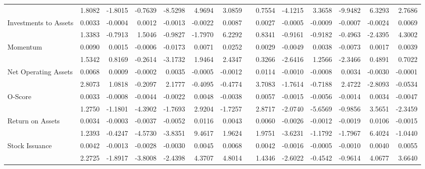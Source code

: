 \begin{table}[h]
{\begin{tabular}{lrrrrrrrrrrrrr}
& 1.8082 & -1.8015 & -0.7639 & -8.5298 & 4.9694 & 3.0859 &       & 0.7554 & -4.1215 & 3.3658 & -9.9482 & 6.3293 & 2.7686 \\
Investments to Assets & 0.0033 & -0.0004 & 0.0012 & -0.0013 & -0.0022 & 0.0087 &       & 0.0027 & -0.0005 & -0.0009 & -0.0007 & -0.0024 & 0.0069 \\
& 1.3383 & -0.7913 & 1.5046 & -0.9827 & -1.7970 & 6.2292 &       & 0.8341 & -0.9161 & -0.9182 & -0.4963 & -2.4395 & 4.3002 \\
Momentum & 0.0090 & 0.0015 & -0.0006 & -0.0173 & 0.0071 & 0.0252 &       & 0.0029 & -0.0049 & 0.0038 & -0.0073 & 0.0017 & 0.0039 \\
& 1.5342 & 0.8169 & -0.2614 & -3.1732 & 1.9464 & 2.4347 &       & 0.3266 & -2.6416 & 1.2566 & -2.3466 & 0.4891 & 0.7022 \\
Net Operating Assets & 0.0068 & 0.0009 & -0.0002 & 0.0035 & -0.0005 & -0.0012 &       & 0.0114 & -0.0010 & -0.0008 & 0.0034 & -0.0030 & -0.0001 \\
& 2.8073 & 1.0818 & -0.2097 & 2.1777 & -0.4095 & -0.4774 &       & 3.7083 & -1.7614 & -0.7188 & 2.4722 & -2.8093 & -0.0534 \\
O-Score & 0.0033 & -0.0008 & -0.0044 & -0.0022 & 0.0048 & -0.0038 &       & 0.0057 & -0.0015 & -0.0056 & -0.0014 & 0.0034 & -0.0047 \\
& 1.2750 & -1.1801 & -4.3902 & -1.7693 & 2.9204 & -1.7257 &       & 2.8717 & -2.0740 & -5.6569 & -0.9856 & 3.5651 & -2.3459 \\
Return on Assets & 0.0034 & -0.0003 & -0.0037 & -0.0052 & 0.0116 & 0.0043 &       & 0.0060 & -0.0026 & -0.0012 & -0.0019 & 0.0106 & -0.0015 \\
& 1.2393 & -0.4247 & -4.5730 & -3.8351 & 9.4617 & 1.9624 &       & 1.9751 & -3.6231 & -1.1792 & -1.7967 & 6.4024 & -1.0440 \\
Stock Issuance & 0.0042 & -0.0013 & -0.0028 & -0.0030 & 0.0045 & 0.0068 &       & 0.0042 & -0.0016 & -0.0005 & -0.0010 & 0.0040 & 0.0055 \\
& 2.2725 & -1.8917 & -3.8008 & -2.4398 & 4.3707 & 4.8014 &       & 1.4346 & -2.6022 & -0.4542 & -0.9614 & 4.0677 & 3.6640 \\
\bottomrule
\end{tabular}%
}
\label{tab:liq-ff5}%
\end{table}%

